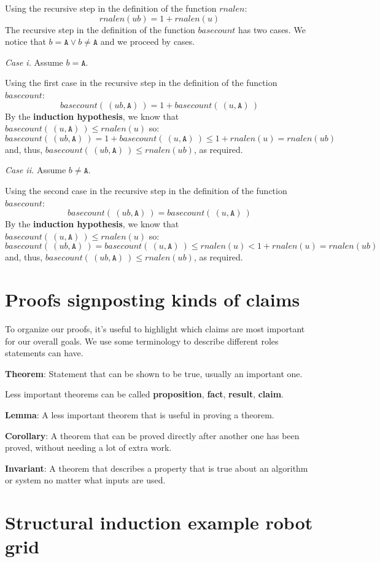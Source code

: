 \documentclass[12pt, oneside]{article}
\newcommand{\A}[0]{\texttt{A}}
\begin{document}
Using the recursive step in the definition of the function $rnalen$:
\[
    rnalen(ub) = 1 + rnalen(u)
\]
The recursive step in the definition of the function $basecount$ has two cases. We notice that 
$b = \A \lor b \neq \A$ and we proceed by cases.

{\it Case i.} Assume $b = \A$.

Using the first case in the recursive step in the definition of the function $basecount$:
\[
    basecount(~(ub, \A)~) = 1 + basecount(~(u,\A)~)
\]
By the {\bf induction hypothesis}, we know that $basecount(~(u,\A)~) \leq rnalen(u)$ so:
\[
    basecount(~(ub, \A)~) = 1 + basecount(~(u,\A)~) \leq 1 + rnalen(u) = rnalen (ub)
\]
and, thus, $basecount(~(ub,\A)~) \leq rnalen(ub)$, as required.

{\it Case ii.} Assume $b \neq \A$. 

Using the second case in the recursive step in the definition of the function $basecount$:
\[
    basecount(~(ub, \A)~) = basecount(~(u,\A)~)
\]
By the {\bf induction hypothesis}, we know that $basecount(~(u,\A)~) \leq rnalen(u)$ so:
\[
    basecount(~(ub, \A)~) = basecount(~(u,\A)~) \leq rnalen(u) < 1 + rnalen(u) = rnalen (ub)
\]
and, thus, $basecount(~(ub,\A)~) \leq rnalen(ub)$, as required.
 \vfill
\section*{Proofs signposting kinds of claims}


To organize our proofs, it's useful to highlight which claims are most important for 
our overall goals.
We use some terminology to describe different roles statements can have.

{\bf Theorem}: Statement that can be shown to be true, usually an important one.

Less important theorems can be called {\bf proposition}, {\bf fact}, {\bf result}, {\bf claim}.

{\bf Lemma}: A less important theorem that is useful in proving a theorem.
 
{\bf Corollary}: A theorem that can be proved directly after another one has been proved, 
without needing a lot of extra work.

{\bf Invariant}: A theorem that describes a property that is true about an algorithm or 
system no matter what inputs are used.




 \vfill
\section*{Structural induction example robot grid}
\end{document}
